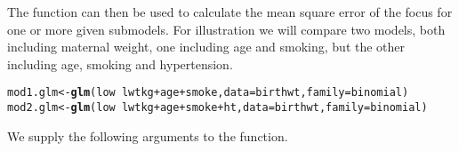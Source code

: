 \documentclass[article,shortnames,nojss,nofooter]{jss}\usepackage[]{graphicx}\usepackage[]{color}
\makeatletter
\newcommand{\hlopt}[1]{\textcolor[rgb]{0,0,0}{#1}}%
\newcommand{\hlstd}[1]{\textcolor[rgb]{0.345,0.345,0.345}{#1}}%
\newcommand{\hlkwb}[1]{\textcolor[rgb]{0.69,0.353,0.396}{#1}}%
\newcommand{\hlkwc}[1]{\textcolor[rgb]{0.333,0.667,0.333}{#1}}%
\newcommand{\hlkwd}[1]{\textcolor[rgb]{0.737,0.353,0.396}{\textbf{#1}}}%
\newenvironment{kframe}{%
 \def\at@end@of@kframe{}%
 \ifinner\ifhmode%
  \def\at@end@of@kframe{\end{minipage}}%
  \begin{minipage}{\columnwidth}%
 \fi\fi%
 \def\FrameCommand##1{\hskip\@totalleftmargin \hskip-\fboxsep
 \colorbox{shadecolor}{##1}\hskip-\fboxsep
     \hskip-\linewidth \hskip-\@totalleftmargin \hskip\columnwidth}%
 \MakeFramed {\advance\hsize-\width
   \@totalleftmargin\z@ \linewidth\hsize
   \@setminipage}}%
 {\par\unskip\endMakeFramed%
 \at@end@of@kframe}
\newenvironment{knitrout}{}{} %
\makeatother
\begin{document}
The  function can then be used to calculate the mean square error of the focus for one or more given submodels.  For illustration we will compare two models, both including maternal weight, one including age and smoking, but the other including age, smoking and hypertension. 

\begin{knitrout}
\color{fgcolor}\begin{kframe}
\begin{alltt}
\hlstd{mod1.glm} \hlkwb{<-} \hlkwd{glm}\hlstd{(low} \hlopt{~} \hlstd{lwtkg} \hlopt{+} \hlstd{age} \hlopt{+} \hlstd{smoke,} \hlkwc{data}\hlstd{=birthwt,} \hlkwc{family}\hlstd{=binomial)}
\hlstd{mod2.glm} \hlkwb{<-} \hlkwd{glm}\hlstd{(low} \hlopt{~} \hlstd{lwtkg} \hlopt{+} \hlstd{age} \hlopt{+} \hlstd{smoke} \hlopt{+} \hlstd{ht,} \hlkwc{data}\hlstd{=birthwt,} \hlkwc{family}\hlstd{=binomial)}
\end{alltt}
\end{kframe}
\end{knitrout}

We supply the following arguments to the  function.
\end{document}
